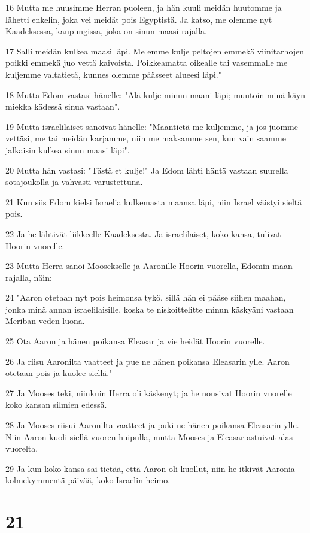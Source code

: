 \par 16 Mutta me huusimme Herran puoleen, ja hän kuuli meidän huutomme ja lähetti enkelin, joka vei meidät pois Egyptistä. Ja katso, me olemme nyt Kaadeksessa, kaupungissa, joka on sinun maasi rajalla.
\par 17 Salli meidän kulkea maasi läpi. Me emme kulje peltojen emmekä viinitarhojen poikki emmekä juo vettä kaivoista. Poikkeamatta oikealle tai vasemmalle me kuljemme valtatietä, kunnes olemme päässeet alueesi läpi."
\par 18 Mutta Edom vastasi hänelle: "Älä kulje minun maani läpi; muutoin minä käyn miekka kädessä sinua vastaan".
\par 19 Mutta israelilaiset sanoivat hänelle: "Maantietä me kuljemme, ja jos juomme vettäsi, me tai meidän karjamme, niin me maksamme sen, kun vain saamme jalkaisin kulkea sinun maasi läpi".
\par 20 Mutta hän vastasi: "Tästä et kulje!" Ja Edom lähti häntä vastaan suurella sotajoukolla ja vahvasti varustettuna.
\par 21 Kun siis Edom kielsi Israelia kulkemasta maansa läpi, niin Israel väistyi sieltä pois.
\par 22 Ja he lähtivät liikkeelle Kaadeksesta. Ja israelilaiset, koko kansa, tulivat Hoorin vuorelle.
\par 23 Mutta Herra sanoi Moosekselle ja Aaronille Hoorin vuorella, Edomin maan rajalla, näin:
\par 24 "Aaron otetaan nyt pois heimonsa tykö, sillä hän ei pääse siihen maahan, jonka minä annan israelilaisille, koska te niskoittelitte minun käskyäni vastaan Meriban veden luona.
\par 25 Ota Aaron ja hänen poikansa Eleasar ja vie heidät Hoorin vuorelle.
\par 26 Ja riisu Aaronilta vaatteet ja pue ne hänen poikansa Eleasarin ylle. Aaron otetaan pois ja kuolee siellä."
\par 27 Ja Mooses teki, niinkuin Herra oli käskenyt; ja he nousivat Hoorin vuorelle koko kansan silmien edessä.
\par 28 Ja Mooses riisui Aaronilta vaatteet ja puki ne hänen poikansa Eleasarin ylle. Niin Aaron kuoli siellä vuoren huipulla, mutta Mooses ja Eleasar astuivat alas vuorelta.
\par 29 Ja kun koko kansa sai tietää, että Aaron oli kuollut, niin he itkivät Aaronia kolmekymmentä päivää, koko Israelin heimo.

\chapter{21}

